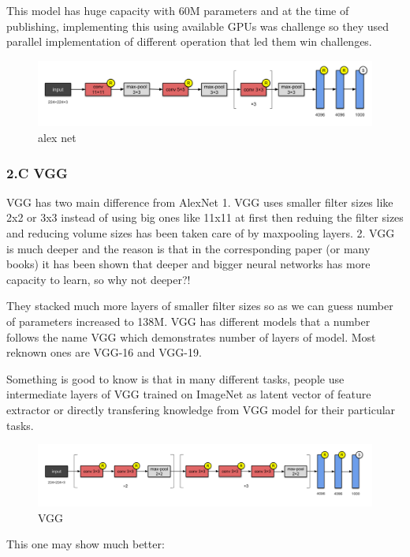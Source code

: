 \documentclass[11pt]{article}
\makeatletter
\def\maxwidth{\ifdim\Gin@nat@width>\linewidth\linewidth
    \else\Gin@nat@width\fi}
\let\Oldincludegraphics\includegraphics
\renewcommand{\includegraphics}[1]{\Oldincludegraphics[width=.8\maxwidth]{#1}}
\makeatother
\begin{document}
This model has huge capacity with 60M parameters and at the time of
publishing, implementing this using available GPUs was challenge so they
used parallel implementation of different operation that led them win
challenges.

\begin{figure}
\centering
\includegraphics{wiki/2_2.png}
\caption{alex net}
\end{figure}

    \hypertarget{c-vgg}{%
\subsubsection{2.C VGG}\label{c-vgg}}

VGG has two main difference from AlexNet 1. VGG uses smaller filter
sizes like 2x2 or 3x3 instead of using big ones like 11x11 at first then
reduing the filter sizes and reducing volume sizes has been taken care
of by maxpooling layers. 2. VGG is much deeper and the reason is that in
the corresponding paper (or many books) it has been shown that deeper
and bigger neural networks has more capacity to learn, so why not
deeper?!

They stacked much more layers of smaller filter sizes so as we can guess
number of parameters increased to 138M. VGG has different models that a
number follows the name VGG which demonstrates number of layers of
model. Most reknown ones are VGG-16 and VGG-19.

Something is good to know is that in many different tasks, people use
intermediate layers of VGG trained on ImageNet as latent vector of
feature extractor or directly transfering knowledge from VGG model for
their particular tasks.

\begin{figure}
\centering
\includegraphics{wiki/2_3.png}
\caption{VGG}
\end{figure}

This one may show much better:
\end{document}
